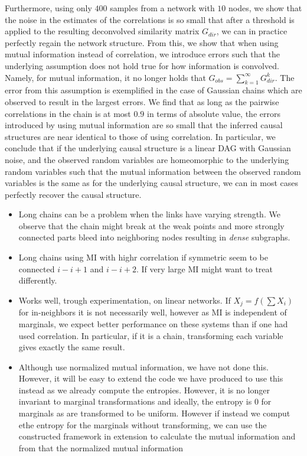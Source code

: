 \documentclass[../Thesis.tex]{subfiles}
\begin{document}
Furthermore, using only $400$ samples from a network with $10$ nodes, we show that the noise in the estimates of the correlations is so small that after a threshold is applied to the resulting deconvolved similarity matrix $G_{dir}$, we can in practice perfectly regain the network structure. From this, we show that when using mutual information instead of correlation, we introduce errors such that the underlying assumption does not hold true for how information is convolved. Namely, for mutual information, it no longer holds that $G_{obs} = \sum_{k = 1}^{\infty} G_{dir}^k$. The error from this assumption is exemplified in the case of Gaussian chains which are observed to result in the largest errors. We find that as long as the pairwise correlations in the chain is at most $0.9$ in terms of absolute value, the errors introduced by using mutual information are so small that the inferred causal structures are near identical to those of using correlation. In particular, we conclude that if the underlying causal structure is a linear DAG with Gaussian noise, and the observed random variables are homeomorphic to the underlying random variables such that the mutual information between the observed random variables is the same as for the underlying causal structure, we can in most cases perfectly recover the causal structure. 


\begin{itemize}
    \item Long chains can be a problem when the links have varying strength. We observe that the chain might break at the weak points and more strongly connected parts bleed into neighboring nodes resulting in \textit{dense} subgraphs.
    \item Long chains using MI with highr correlation if symmetric seem to be connected $i - i+1$ and $i - i+2$. If very large MI might want to treat differently.
    \item Works well, trough experimentation, on linear networks. If $X_j = f(\sum X_i)$ for in-neighbors it is not necessarily well, however as MI is independent of marginals, we expect better performance on these systems than if one had used correlation. In particular, if it is a chain, transforming each variable gives exactly the same result.
    \item Although \cite{An_effective_approach_for_causal_variables_analysis_in_diesel_engine_production_by_using_mutual_information_and_network_deconvolution} use normalized mutual information, we have not done this. However, it will be easy to extend the code we have produced to use this instead as we already compute the entropies. However, it is no longer invariant to marginal transformations and ideally, the entropy is 0 for marginals as are transformed to be uniform. However if instead we comput ethe entropy for the marginals without transforming, we can use the constructed framework in extension to calculate the mutual information and from that the normalized mutual information
\end{itemize}
\end{document}

